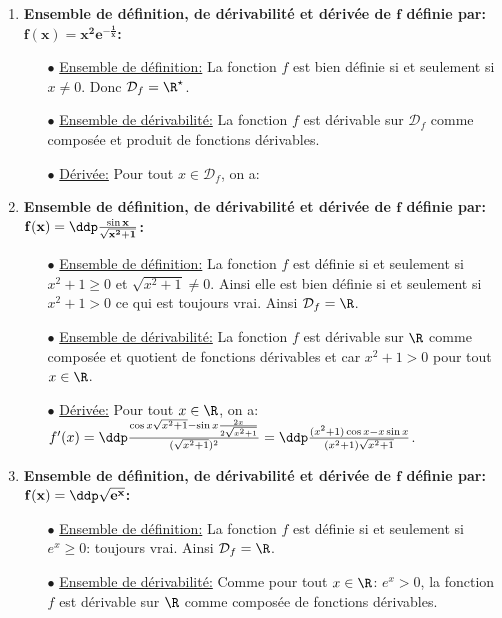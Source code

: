 \begin{correction}  \;
\begin{enumerate}
\item \textbf{Ensemble de d\'efinition, de d\'erivabilit\'e et d\'eriv\'ee de $\mathbf{f}$ d\'efinie par: $\mathbf{f(x)=x^2e^{-\frac{1}{x}}}$:}
\begin{itemize}
\item[$\bullet$] \underline{Ensemble de d\'efinition:} La fonction $f$ est bien d\'efinie si et seulement si $x\not= 0$. Donc $\mathcal{D}_f=\R^{\star}$.
\item[$\bullet$] \underline{Ensemble de d\'erivabilit\'e:} La fonction $f$ est d\'erivable sur $\mathcal{D}_f$ comme compos\'ee et produit de fonctions d\'erivables.
\item[$\bullet$] \underline{D\'eriv\'ee:} Pour tout $x\in\mathcal{D}_f$, on a: 
 \end{itemize}
\item  \textbf{Ensemble de d\'efinition, de d\'erivabilit\'e et d\'eriv\'ee de $\mathbf{f}$ d\'efinie par: $\mathbf{f(x)=\ddp \frac{\sin x}{\sqrt{x^2+1}}}$:}
\begin{itemize}
\item[$\bullet$] \underline{Ensemble de d\'efinition:} La fonction $f$ est d\'efinie si et seulement si $x^2+1\geq 0$ et $\sqrt{x^2+1}\not= 0$. Ainsi elle est bien d\'efinie si et seulement si $x^2+1>0$ ce qui est toujours vrai. Ainsi $\mathcal{D}_{f}=\R$. 
\item[$\bullet$] \underline{Ensemble de d\'erivabilit\'e:} La fonction $f$ est d\'erivable sur $\R$ comme compos\'ee et quotient de fonctions d\'erivables et car $x^2+1>0$ pour tout $x\in\R$. 
\item[$\bullet$] \underline{D\'eriv\'ee:} Pour tout $x\in\R$, on a: $f^{\prime}(x)=\ddp\frac{ \cos{x}\sqrt{x^2+1}-\sin{x}\frac{2x}{2\sqrt{x^2+1}}  }{(\sqrt{x^2+1})^2}= \ddp\frac{ (x^2+1)\cos{x}-x\sin{x} }{(x^2+1)\sqrt{x^2+1}}$.
 \end{itemize}
\item  \textbf{Ensemble de d\'efinition, de d\'erivabilit\'e et d\'eriv\'ee de $\mathbf{f}$ d\'efinie par: $\mathbf{f(x)=\ddp \sqrt{e^x}}$:}
\begin{itemize}
\item[$\bullet$] \underline{Ensemble de d\'efinition:} La fonction $f$ est d\'efinie si et seulement si $e^x\geq 0$: toujours vrai. Ainsi $\mathcal{D}_{f}=\R$. 
\item[$\bullet$] \underline{Ensemble de d\'erivabilit\'e:} Comme pour tout $x\in\R$: $e^x>0$, la fonction $f$ est d\'erivable sur $\R$ comme compos\'ee de fonctions d\'erivables.

\end{itemize}
\end{enumerate}
\end{correction}

